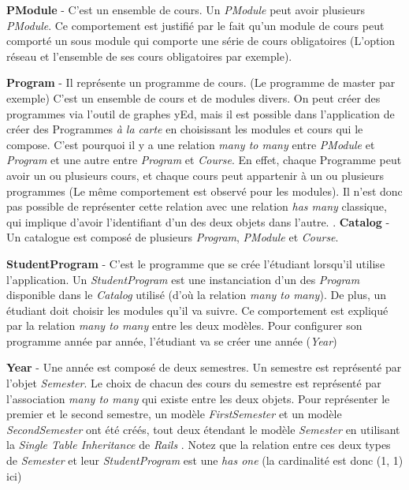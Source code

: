 \textbf{PModule} - C'est un ensemble de cours. Un \textit{PModule} peut avoir plusieurs \textit{PModule}. Ce comportement est justifié par le fait qu'un module de cours peut comporté un sous module qui comporte une série de cours obligatoires (L'option réseau et l'ensemble de ses cours obligatoires par exemple).

\textbf{Program} - Il représente un programme de cours. (Le programme de master par exemple) C'est un ensemble de cours et de modules divers. On peut créer des programmes via l'outil de graphes yEd, mais il est possible dans l'application de créer des Programmes \textit{à la carte} en choisissant les modules et cours qui le compose. C'est pourquoi il y a une relation \textit{many to many} entre \textit{PModule} et \textit{Program} et une autre entre \textit{Program} et \textit{Course}. En effet, chaque Programme peut avoir un ou plusieurs cours, et chaque cours peut appartenir à un ou plusieurs programmes (Le même comportement est observé pour les modules). Il n'est donc pas possible de représenter cette relation avec une relation \textit{has many} classique, qui implique d'avoir l'identifiant d'un des deux objets dans l'autre. \cite{active_record}. 
\textbf{Catalog} - Un catalogue est composé de plusieurs \textit{Program}, \textit{PModule} et \textit{Course}.

\textbf{StudentProgram} - C'est le programme que se crée l'étudiant lorsqu'il utilise l'application. Un \textit{StudentProgram} est une instanciation d'un des \textit{Program} disponible dans le \textit{Catalog} utilisé (d'où la relation \textit{many to many}). De plus, un étudiant doit choisir les modules qu'il va suivre. Ce comportement est expliqué par la relation \textit{many to many} entre les deux modèles. Pour configurer son programme année par année, l'étudiant va se créer une année (\textit{Year})

\textbf{Year} - Une année est composé de deux semestres. Un semestre est représenté par l'objet \textit{Semester}. Le choix de chacun des cours du semestre est représenté par l'association \textit{many to many} qui existe entre les deux objets. Pour représenter le premier et le second semestre, un modèle \textit{FirstSemester} et un modèle \textit{SecondSemester} ont été créés, tout deux étendant le modèle \textit{Semester} en utilisant la \textit{Single Table Inheritance} de \textit{Rails} \cite{STI}. Notez que la relation entre ces deux types de \textit{Semester} et leur \textit{StudentProgram} est une \textit{has one} (la cardinalité est donc (1, 1) ici)


